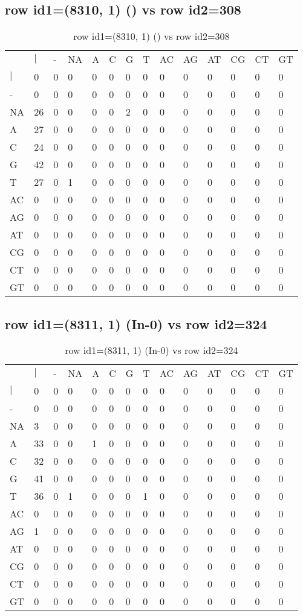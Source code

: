 \subsection{row id1=(8310, 1) () vs row id2=308}
\begin{center}
\begin{longtable}{|l|l|l|l|l|l|l|l|l|l|l|l|l|l|}
\caption{row id1=(8310, 1) () vs row id2=308} \label{table_dm294}\\
\hline
\\
\hline
&$|$&-&NA&A&C&G&T&AC&AG&AT&CG&CT&GT\\
$|$&0&0&0&0&0&0&0&0&0&0&0&0&0\\
-&0&0&0&0&0&0&0&0&0&0&0&0&0\\
NA&26&0&0&0&0&2&0&0&0&0&0&0&0\\
A&27&0&0&0&0&0&0&0&0&0&0&0&0\\
C&24&0&0&0&0&0&0&0&0&0&0&0&0\\
G&42&0&0&0&0&0&0&0&0&0&0&0&0\\
T&27&0&1&0&0&0&0&0&0&0&0&0&0\\
AC&0&0&0&0&0&0&0&0&0&0&0&0&0\\
AG&0&0&0&0&0&0&0&0&0&0&0&0&0\\
AT&0&0&0&0&0&0&0&0&0&0&0&0&0\\
CG&0&0&0&0&0&0&0&0&0&0&0&0&0\\
CT&0&0&0&0&0&0&0&0&0&0&0&0&0\\
GT&0&0&0&0&0&0&0&0&0&0&0&0&0\\
\hline
\end{longtable}
\end{center}

\subsection{row id1=(8311, 1) (In-0) vs row id2=324}
\begin{center}
\begin{longtable}{|l|l|l|l|l|l|l|l|l|l|l|l|l|l|}
\caption{row id1=(8311, 1) (In-0) vs row id2=324} \label{table_dm296}\\
\hline
\\
\hline
&$|$&-&NA&A&C&G&T&AC&AG&AT&CG&CT&GT\\
$|$&0&0&0&0&0&0&0&0&0&0&0&0&0\\
-&0&0&0&0&0&0&0&0&0&0&0&0&0\\
NA&3&0&0&0&0&0&0&0&0&0&0&0&0\\
A&33&0&0&1&0&0&0&0&0&0&0&0&0\\
C&32&0&0&0&0&0&0&0&0&0&0&0&0\\
G&41&0&0&0&0&0&0&0&0&0&0&0&0\\
T&36&0&1&0&0&0&1&0&0&0&0&0&0\\
AC&0&0&0&0&0&0&0&0&0&0&0&0&0\\
AG&1&0&0&0&0&0&0&0&0&0&0&0&0\\
AT&0&0&0&0&0&0&0&0&0&0&0&0&0\\
CG&0&0&0&0&0&0&0&0&0&0&0&0&0\\
CT&0&0&0&0&0&0&0&0&0&0&0&0&0\\
GT&0&0&0&0&0&0&0&0&0&0&0&0&0\\
\hline
\end{longtable}
\end{center}

